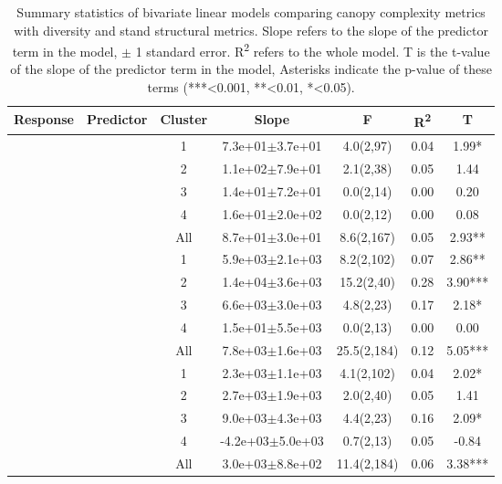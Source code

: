 \begin{longtable}{llccccS[table-format=-2.2, table-space-text-post = {***}]}
\caption{Summary statistics of bivariate linear models comparing canopy complexity metrics with diversity and stand structural metrics. Slope refers to the slope of the predictor term in the model, $\pm{}$ 1 standard error. R\textsuperscript{2} refers to the whole model. T is the t-value of the slope of the predictor term in the model, Asterisks indicate the p-value of these terms (***<0.001, **<0.01, *<0.05).} \\ 
  \toprule
{Response} & {Predictor} & {Cluster} & {Slope} & {F} & {R\textsuperscript{2}} & {T} \\ 
  \midrule
{} & {} & 1 &  7.3e+01$\pm$3.7e+01 & 4.0(2,97) & 0.04 & 1.99* \\ 
   &  & 2 &  1.1e+02$\pm$7.9e+01 & 2.1(2,38) & 0.05 & 1.44 \\ 
   &  & 3 &  1.4e+01$\pm$7.2e+01 & 0.0(2,14) & 0.00 & 0.20 \\ 
   &  & 4 &  1.6e+01$\pm$2.0e+02 & 0.0(2,12) & 0.00 & 0.08 \\ 
   &  & All &  8.7e+01$\pm$3.0e+01 & 8.6(2,167) & 0.05 & 2.93** \\ 
   \midrule
{} & {} & 1 &  5.9e+03$\pm$2.1e+03 & 8.2(2,102) & 0.07 & 2.86** \\ 
   &  & 2 &  1.4e+04$\pm$3.6e+03 & 15.2(2,40) & 0.28 & 3.90*** \\ 
   &  & 3 &  6.6e+03$\pm$3.0e+03 & 4.8(2,23) & 0.17 & 2.18* \\ 
   &  & 4 &  1.5e+01$\pm$5.5e+03 & 0.0(2,13) & 0.00 & 0.00 \\ 
   &  & All &  7.8e+03$\pm$1.6e+03 & 25.5(2,184) & 0.12 & 5.05*** \\ 
   \midrule
{} & {} & 1 &  2.3e+03$\pm$1.1e+03 & 4.1(2,102) & 0.04 & 2.02* \\ 
   &  & 2 &  2.7e+03$\pm$1.9e+03 & 2.0(2,40) & 0.05 & 1.41 \\ 
   &  & 3 &  9.0e+03$\pm$4.3e+03 & 4.4(2,23) & 0.16 & 2.09* \\ 
   &  & 4 & -4.2e+03$\pm$5.0e+03 & 0.7(2,13) & 0.05 & -0.84 \\ 
   &  & All &  3.0e+03$\pm$8.8e+02 & 11.4(2,184) & 0.06 & 3.38*** \\ 
   \midrule

\end{longtable}
